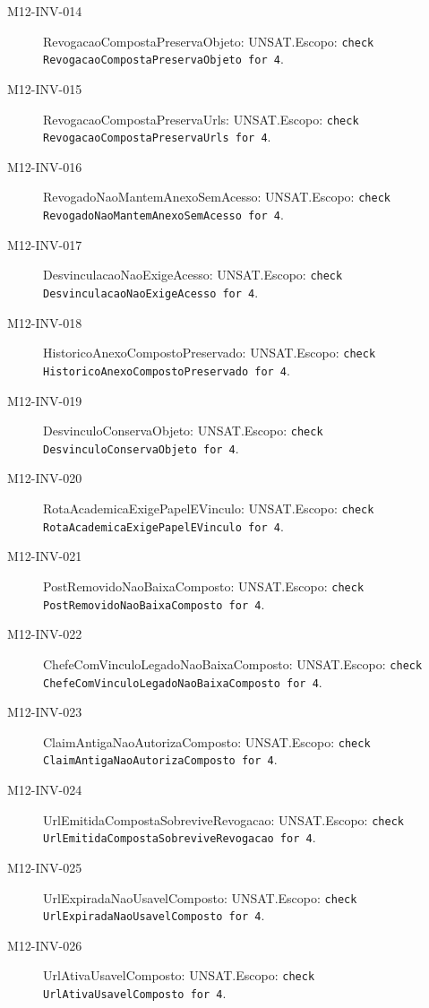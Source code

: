 \begin{description}
\item[M12-INV-014] RevogacaoCompostaPreservaObjeto: UNSAT.\newline Escopo: \texttt{check RevogacaoCompostaPreservaObjeto for 4}.
\item[M12-INV-015] RevogacaoCompostaPreservaUrls: UNSAT.\newline Escopo: \texttt{check RevogacaoCompostaPreservaUrls for 4}.
\item[M12-INV-016] RevogadoNaoMantemAnexoSemAcesso: UNSAT.\newline Escopo: \texttt{check RevogadoNaoMantemAnexoSemAcesso for 4}.
\item[M12-INV-017] DesvinculacaoNaoExigeAcesso: UNSAT.\newline Escopo: \texttt{check DesvinculacaoNaoExigeAcesso for 4}.
\item[M12-INV-018] HistoricoAnexoCompostoPreservado: UNSAT.\newline Escopo: \texttt{check HistoricoAnexoCompostoPreservado for 4}.
\item[M12-INV-019] DesvinculoConservaObjeto: UNSAT.\newline Escopo: \texttt{check DesvinculoConservaObjeto for 4}.
\item[M12-INV-020] RotaAcademicaExigePapelEVinculo: UNSAT.\newline Escopo: \texttt{check RotaAcademicaExigePapelEVinculo for 4}.
\item[M12-INV-021] PostRemovidoNaoBaixaComposto: UNSAT.\newline Escopo: \texttt{check PostRemovidoNaoBaixaComposto for 4}.
\item[M12-INV-022] ChefeComVinculoLegadoNaoBaixaComposto: UNSAT.\newline Escopo: \texttt{check ChefeComVinculoLegadoNaoBaixaComposto for 4}.
\item[M12-INV-023] ClaimAntigaNaoAutorizaComposto: UNSAT.\newline Escopo: \texttt{check ClaimAntigaNaoAutorizaComposto for 4}.
\item[M12-INV-024] UrlEmitidaCompostaSobreviveRevogacao: UNSAT.\newline Escopo: \texttt{check UrlEmitidaCompostaSobreviveRevogacao for 4}.
\item[M12-INV-025] UrlExpiradaNaoUsavelComposto: UNSAT.\newline Escopo: \texttt{check UrlExpiradaNaoUsavelComposto for 4}.
\item[M12-INV-026] UrlAtivaUsavelComposto: UNSAT.\newline Escopo: \texttt{check UrlAtivaUsavelComposto for 4}.

\end{description}
